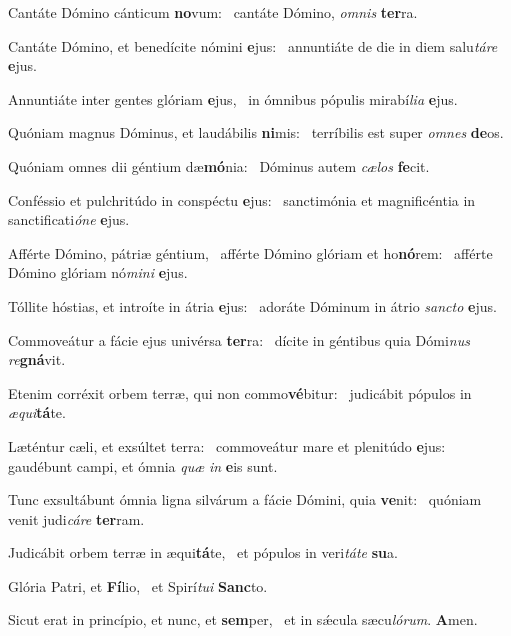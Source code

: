\item Cantáte Dómino cánticum \textbf{no}vum:~\psstar{} cantáte Dómino, \textit{omnis} \textbf{ter}ra.
\item Cantáte Dómino, et benedícite nómini \textbf{e}jus:~\psstar{} annuntiáte de die in diem salu\textit{táre} \textbf{e}jus.
\item Annuntiáte inter gentes glóriam \textbf{e}jus,~\psstar{} in ómnibus pópulis mirabí\textit{lia} \textbf{e}jus.
\item Quóniam magnus Dóminus, et laudábilis \textbf{ni}mis:~\psstar{} terríbilis est super \textit{omnes} \textbf{de}os.
\item Quóniam omnes dii géntium dæ\textbf{mó}nia:~\psstar{} Dóminus autem \textit{cælos} \textbf{fe}cit.
\item Conféssio et pulchritúdo in conspéctu \textbf{e}jus:~\psstar{} sanctimónia et magnificéntia in sanctificati\textit{óne} \textbf{e}jus.
\item Afférte Dómino, pátriæ géntium,~\pscross{} afférte Dómino glóriam et ho\textbf{nó}rem:~\psstar{} afférte Dómino glóriam nó\textit{mini} \textbf{e}jus.
\item Tóllite hóstias, et introíte in átria \textbf{e}jus:~\psstar{} adoráte Dóminum in átrio \textit{sancto} \textbf{e}jus.
\item Commoveátur a fácie ejus univérsa \textbf{ter}ra:~\psstar{} dícite in géntibus quia Dómi\textit{nus} \textit{re}\textbf{gná}vit.
\item Etenim corréxit orbem terræ, qui non commo\textbf{vé}bitur:~\psstar{} judicábit pópulos in \textit{æqui}\textbf{tá}te.
\item Læténtur cæli, et exsúltet terra:~\pscross{} commoveátur mare et plenitúdo \textbf{e}jus:~\psstar{} gaudébunt campi, et ómnia \textit{quæ} \textit{in} \textbf{e}is sunt.
\item Tunc exsultábunt ómnia ligna silvárum a fácie Dómini, quia \textbf{ve}nit:~\psstar{} quóniam venit judi\textit{cáre} \textbf{ter}ram.
\item Judicábit orbem terræ in æqui\textbf{tá}te,~\psstar{} et pópulos in veri\textit{táte} \textbf{su}a.
\item Glória Patri, et \textbf{Fí}lio,~\psstar{} et Spirí\textit{tui} \textbf{Sanc}to.
\item Sicut erat in princípio, et nunc, et \textbf{sem}per,~\psstar{} et in sǽcula sæcu\textit{lórum}. \textbf{A}men.
